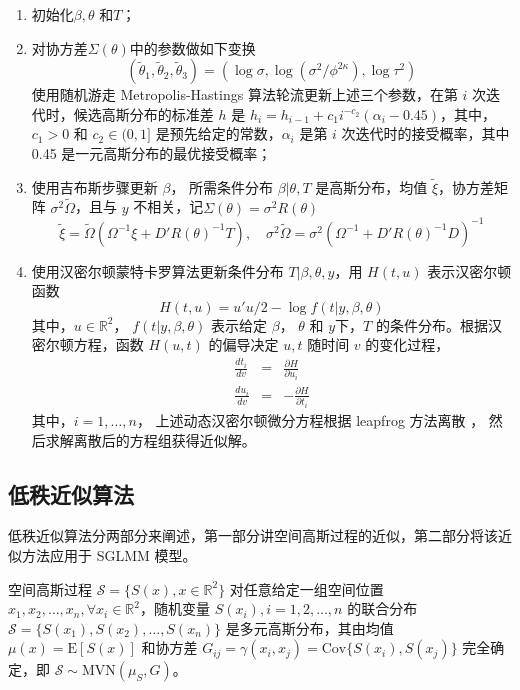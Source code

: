 \documentclass[12pt,a4paper,UTF8,twoside]{book}
\providecommand{\tightlist}{%
  \setlength{\itemsep}{0pt}\setlength{\parskip}{0pt}}
\theoremstyle{definition}
\theoremstyle{definition}
\theoremstyle{definition}
\theoremstyle{remark}
\begin{document}
\begin{enumerate}
\def\labelenumi{\arabic{enumi}.}
\tightlist
\item
  初始化\(\beta, \theta\) 和\(T\)；
\item
  对协方差\(\Sigma(\theta)\)中的参数做如下变换 \citep{Christensen2006}
  \[(\tilde{\theta}_{1}, \tilde{\theta}_{2}, \tilde{\theta}_{3}) = (\log \sigma, \log (\sigma^2/\phi^{2\kappa}), \log \tau^2)\]
  使用随机游走 Metropolis-Hastings 算法轮流更新上述三个参数，在第 \(i\)
  次迭代时，候选高斯分布的标准差 \(h\) 是
  \(h_{i} = h_{i-1} + c_{1}i^{-c_{2}}(\alpha_{i}-0.45)\)，其中，\(c_{1} > 0\)
  和 \(c_{2} \in (0,1]\) 是预先给定的常数，\(\alpha_i\) 是第 \(i\)
  次迭代时的接受概率，其中 0.45 是一元高斯分布的最优接受概率；
\item
  使用吉布斯步骤更新 \(\beta\)， 所需条件分布 \(\beta|\theta,T\)
  是高斯分布，均值 \(\tilde{\xi}\)，协方差矩阵
  \(\sigma^2\tilde{\Omega}\)，且与 \(y\)
  不相关，记\(\Sigma(\theta) = \sigma^2 R(\theta)\) \[
  \tilde{\xi}  =  \tilde{\Omega}(\Omega^{-1}\xi+D' R(\theta)^{-1} T), \quad
  \sigma^2 \tilde{\Omega}  =  \sigma^2(\Omega^{-1} + D' R(\theta)^{-1} D)^{-1}
  \]
\item
  使用汉密尔顿蒙特卡罗算法更新条件分布 \(T|\beta,\theta,y\)，用
  \(H(t,u)\) 表示汉密尔顿函数
  \[H(t, u) = u' u/2 - \log f(t | y, \beta, \theta)\]
  \noindent 其中，\(u\in\mathbb{R}^2\)， \(f(t | y, \beta, \theta)\)
  表示给定 \(\beta\)， \(\theta\) 和 \(y\)下，\(T\)
  的条件分布。根据汉密尔顿方程，函数 \(H(u, t)\) 的偏导决定 \(u,t\)
  随时间 \(v\) 的变化过程， \begin{eqnarray*}
  \frac{d t_{i}}{d v} & = & \frac{\partial H}{\partial u_{i}} \\
  \frac{d u_{i}}{d v} & = & -\frac{\partial H}{\partial t_{i}}
  \end{eqnarray*} \noindent 其中，\(i = 1,\ldots, n\)，
  上述动态汉密尔顿微分方程根据 leapfrog 方法离散 \citep{Brooks2011}，
  然后求解离散后的方程组获得近似解。
\end{enumerate}

\hypertarget{LowRank}{%
\subsection{低秩近似算法}\label{LowRank}}

低秩近似算法分两部分来阐述，第一部分讲空间高斯过程的近似，第二部分将该近似方法应用于
SGLMM 模型。

空间高斯过程 \(\mathcal{S} = \{S(x),x\in\mathbb{R}^2\}\)
对任意给定一组空间位置
\(x_1,x_2,\ldots,x_n, \forall x_{i} \in \mathbb{R}^2\)，随机变量
\(S(x_i),i = 1,2,\ldots,n\) 的联合分布
\(\mathcal{S}=\{S(x_1),S(x_2),\ldots,S(x_n)\}\) 是多元高斯分布，其由均值
\(\mu(x) = \mathrm{E}[S(x)]\) 和协方差
\(G_{ij} =\gamma(x_i,x_j)= \mathrm{Cov}\{S(x_i),S(x_j)\}\) 完全确定，即
\(\mathcal{S} \sim \mathrm{MVN}(\mu_{S},G)\)。
\end{document}
